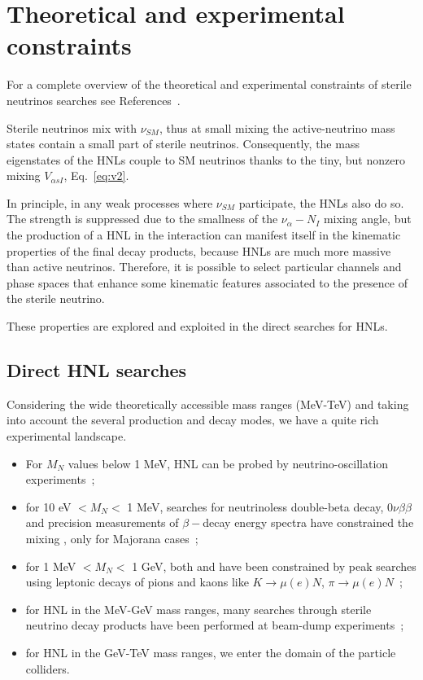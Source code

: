\section{Theoretical and experimental constraints} \label{sec:currentlimits}
For a complete overview of the theoretical and experimental constraints of sterile neutrinos searches see References~\cite{Deppisch_2015,10.3389/fphy.2018.00040,PhysRevD.78.013010,Drewes_2017,DREWES2017250,Antusch_2014}.


Sterile neutrinos mix with $\nu_{SM}$, thus at small mixing the
active-neutrino mass states contain a small part of sterile
neutrinos. Consequently, the mass eigenstates of the HNLs couple to SM
neutrinos thanks to the tiny, but nonzero mixing $V_{\alpha sI}$, Eq.~\ref{eq:v2}.

In principle, in any weak processes where $\nu_{SM}$ participate, the
HNLs also do so. The strength is suppressed due to the smallness of
the $\nu_\alpha - N_I$ mixing angle,
but the production of a HNL in the interaction can manifest itself in the kinematic properties of the final decay products, because HNLs are much more massive than active neutrinos.
Therefore, it is possible to select particular channels and phase spaces that enhance some kinematic features associated to the presence of the sterile neutrino.

These properties are explored and exploited in the direct searches for HNLs.



\subsection{Direct HNL searches}\label{sec:c3directHNL}
Considering the wide theoretically accessible mass ranges (MeV-TeV) and taking into account
the several production and decay modes, we have a quite rich
experimental landscape. 
\begin{itemize}
\item For $M_N$ values below 1 MeV, HNL can be probed by
  neutrino-oscillation experiments~\cite{de_Gouv_a_2005};
\item for 10 eV $< M_N <$ 1 MeV, searches for neutrinoless double-beta decay,
  $0\nu\beta\beta$ and precision measurements of $\beta-$decay energy
  spectra have constrained the mixing \mixpare, only for Majorana cases~\cite{Deppisch_2015};
\item for 1 MeV $< M_N <$ 1 GeV, both \mixpare and \mixparm have been
  constrained by peak searches using leptonic decays of pions
  and kaons like $K \rightarrow \mu(e) N$, $\pi \rightarrow \mu(e)
  N$~\cite{Liventsev_2013};
\item for HNL in the MeV-GeV mass ranges, many searches through
  sterile neutrino decay products have been performed at beam-dump experiments~\cite{DORENBOSCH1986473};
\item for HNL in the GeV-TeV mass ranges, we enter the domain of
  the particle colliders.
\end{itemize}

